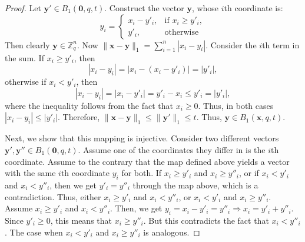 \documentclass[pdflatex,sn-mathphys-num]{sn-jnl}
\theoremstyle{definition}
\newcommand{\vtr}[1]{\mathbf{#1}}
\newcommand{\norm}[1]{\lVert{#1}\rVert}
\begin{document}
\begin{proof}
Let $\vtr{y}' \in B_1(\vtr{0}, q, t)$. Construct the vector $\vtr{y}$, whose $i$th coordinate is:
\[
y_i = \begin{cases}
    x_i - y'_i, & \text{if }x_i \geq y'_i,\\
    y'_i, & \text{otherwise}
\end{cases}
\]
Then clearly $\vtr{y} \in \mathbb{Z}_q^n$. Now $\norm{\vtr{x} - \vtr{y}}_1 = \sum_{i = 1}^n |x_i - y_i|$. Consider the $i$th term in the sum. If $x_i \geq y'_i$, then
\[
|x_i - y_i| = |x_i - (x_i - y'_i)| = |y'_i|,
\]
otherwise if $x_i < y'_i$, then
\[
|x_i -y_i| = |x_i - y'_i| = y'_i - x_i \leq y'_i = |y'_i|,
\]
where the inequality follows from the fact that $x_i \geq 0$. Thus, in both cases $|x_i - y_i| \leq |y'_i|$. Therefore, $\norm{\vtr{x} - \vtr{y}}_1 \leq \norm{\vtr{y}'}_1 \leq t$. Thus, $\vtr{y} \in B_1(\vtr{x}, q, t)$. 

Next, we show that this mapping is injective. Consider two different vectors $\vtr{y}', \vtr{y}'' \in B_1(\vtr{0}, q, t)$. Assume one of the coordinates they differ in is the $i$th coordinate. Assume to the contrary that the map defined above yields a vector with the same $i$th coordinate $y_i$ for both. 
If $x_i \geq y'_i$ and $x_i \geq y''_i$, or if $x_i < y'_i$ and $x_i < y''_i$, then we get $y'_i = y''_i$ through the map above, which is a contradiction. Thus, either $x_i \geq y'_i$ and $x_i < y''_i$, or $x_i < y'_i$ and $x_i \geq y''_i$. Assume $x_i \geq y'_i$ and $x_i < y''_i$. Then, we get $y_i = x_i - y'_i = y''_i \Rightarrow x_i = y'_i + y''_i$. Since $y'_i \geq 0$, this means that $x_i \geq y''_i$. But this contradicts the fact that $x_i < y''_i$. The case when $x_i < y'_i$ and $x_i \geq y''_i$ is analogous. 
\end{proof}
\end{document}
